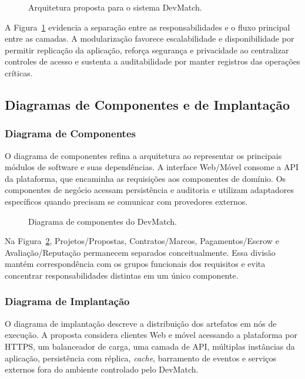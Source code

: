 \begin{figure}[!htbp]
\centering
{}
\caption{Arquitetura proposta para o sistema DevMatch.}
\label{fig:arquitetura}
\end{figure}

A Figura~\ref{fig:arquitetura} evidencia a separação entre as responsabilidades e o fluxo principal entre as camadas. A modularização favorece escalabilidade e disponibilidade por permitir replicação da aplicação, reforça segurança e privacidade ao centralizar controles de acesso e sustenta a auditabilidade por manter registros das operações críticas.

\subsection{Diagramas de Componentes e de Implantação}
\label{sec:componentes}

\subsubsection{Diagrama de Componentes}

O diagrama de componentes refina a arquitetura ao representar os principais módulos de software e suas dependências. A interface Web/Móvel consome a API da plataforma, que encaminha as requisições aos componentes de domínio. Os componentes de negócio acessam persistência e auditoria e utilizam adaptadores específicos quando precisam se comunicar com provedores externos.

\begin{figure}[!htbp]
\centering
{}
\caption{Diagrama de componentes do DevMatch.}
\label{fig:componentes}
\end{figure}

Na Figura~\ref{fig:componentes}, Projetos/Propostas, Contratos/Marcos, Pagamentos/Escrow e Avaliação/Reputação permanecem separados conceitualmente. Essa divisão mantém correspondência com os grupos funcionais dos requisitos e evita concentrar responsabilidades distintas em um único componente.

\subsubsection{Diagrama de Implantação}

O diagrama de implantação descreve a distribuição dos artefatos em nós de execução. A proposta considera clientes Web e móvel acessando a plataforma por HTTPS, um balanceador de carga, uma camada de API, múltiplas instâncias da aplicação, persistência com réplica, \textit{cache}, barramento de eventos e serviços externos fora do ambiente controlado pelo DevMatch.

